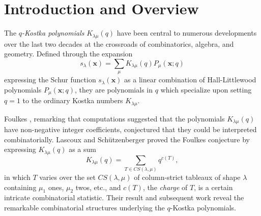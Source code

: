 \documentclass[12pt]{article}
\newcommand{\x}{\mathbf{x}}
\newcommand{\charge}{c}
\newcommand{\chg}{\charge}
\numberwithin{equation}{section}
\theoremstyle{plain}
\theoremstyle{definition}
\theoremstyle{remark}
\begin{document}
\begin{abstract}
Notre travail fournit une interpr\'etation g\'eom\'etrique
de cette  d\'ecom\-po\-si\-tion atomique.
Les r\'esultats de Mehta et van der Kallen \cite{Mehta&vanderKallen} sur la
d\'ecomposition de Frobenius impliquent une d\'ecomposition en
somme directe des id\'eaux de cl\^otures d'orbites nilpotents qui
viennent de l'inclusion des ensembles correspondants.
Nous explicitons la restriction \`a la diagonale en utilisant
un th\'eor\`eme r\'ecent de Broer \cite{Broer}.
On obtient ainsi une d\'ecomposition en somme directe des
id\'eaux constituant les $R_\mu$, ainsi qu'une nouvelle
d\'emonstration de la d\'ecomposition atomique des $q$-polyn\^omes
de Kostka.
\end{abstract}
\section{Introduction and Overview}

The {\it $q$-Kostka polynomials} $K_{\lambda \mu }(q)$ have been
central to numerous developments over the last two decades at the
crossroads of combinatorics, algebra, and geometry.  
Defined through the expansion
\begin{equation}\label{e:definition}
s_{\lambda }(\x) = \sum _{\mu } K_{\lambda \mu }(q) P_{\mu }(\x;q)
\end{equation}
expressing the Schur function $s_{\lambda }(\x)$ as a linear
combination of Hall-Littlewood polynomials $P_{\mu }(\x;q)$, they are
polynomials in $q$ which specialize upon setting $q=1$ to the ordinary
Kostka numbers $K_{\lambda \mu }$. 

Foulkes \cite{Foulkes}, remarking that computations suggested that the
polynomials $K_{\lambda \mu }(q)$ have non-negative integer
coefficients, conjectured that they could be interpreted
combinatorially.  Lascoux and Sch\"utzenberger \cite{Schutzenberger78}
proved the Foulkes conjecture by expressing $K_{\lambda \mu }(q)$ as a
sum
\begin{equation}\label{e:chargeformula}
K_{\lambda \mu }(q) = \sum _{T\in CS(\lambda ,\mu )} q^{\chg(T)},
\end{equation}
in which $T$ varies over the set $CS(\lambda ,\mu )$ of column-strict
tableaux of shape $\lambda $ containing $\mu _{1}$ ones, $\mu _{2}$
twos, etc., and $\chg(T)$, the {\it charge} of $T$, is a certain
intricate combinatorial statistic.  Their result and subsequent work
\cite{L&S:Croissance,L&S:Plaxique,Lascoux} reveal the remarkable
combinatorial structures underlying the $q$-Kostka polynomials.
 
\end{document}
